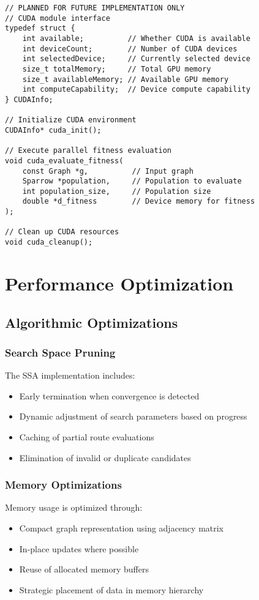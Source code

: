 \documentclass[conference]{IEEEtran}
\begin{document}
\begin{lstlisting}[caption=Future CUDA Module Interface]
// PLANNED FOR FUTURE IMPLEMENTATION ONLY
// CUDA module interface
typedef struct {
    int available;          // Whether CUDA is available
    int deviceCount;        // Number of CUDA devices
    int selectedDevice;     // Currently selected device
    size_t totalMemory;     // Total GPU memory
    size_t availableMemory; // Available GPU memory
    int computeCapability;  // Device compute capability
} CUDAInfo;

// Initialize CUDA environment
CUDAInfo* cuda_init();

// Execute parallel fitness evaluation
void cuda_evaluate_fitness(
    const Graph *g,          // Input graph
    Sparrow *population,     // Population to evaluate
    int population_size,     // Population size
    double *d_fitness        // Device memory for fitness
);

// Clean up CUDA resources
void cuda_cleanup();
\end{lstlisting}

\section{Performance Optimization}

\subsection{Algorithmic Optimizations}

\subsubsection{Search Space Pruning}
The SSA implementation includes:
\begin{itemize}
    \item Early termination when convergence is detected
    \item Dynamic adjustment of search parameters based on progress
    \item Caching of partial route evaluations
    \item Elimination of invalid or duplicate candidates
\end{itemize}

\subsubsection{Memory Optimizations}
Memory usage is optimized through:
\begin{itemize}
    \item Compact graph representation using adjacency matrix
    \item In-place updates where possible
    \item Reuse of allocated memory buffers
    \item Strategic placement of data in memory hierarchy
\end{itemize}
\end{document}
